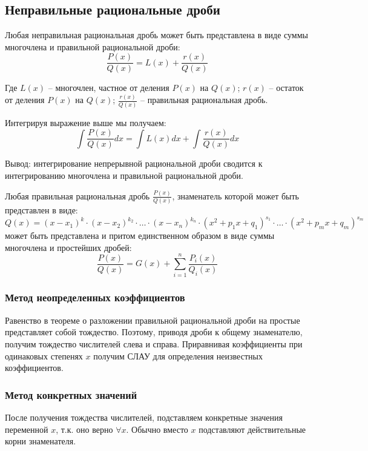 \subsection{Неправильные рациональные дроби}

Любая неправильная рациональная дробь может быть представлена в виде суммы многочлена и правильной рациональной дроби: \[
  \frac{P(x)}{Q(x)} = L(x) + \frac{r(x)}{Q(x)}
\]

Где $L(x)$ -- многочлен, частное от деления $P(x)$ на $Q(x)$; $r(x)$ -- остаток от деления $P(x)$ на $Q(x)$; $\frac{r(x)}{Q(x)}$ -- правильная рациональная дробь.

Интегрируя выражение выше мы получаем: \[
\int \frac{P(x)}{Q(x)} dx = \int L(x) dx + \int \frac{r(x)}{Q(x)}dx
\] 

Вывод: интегрирование непрерывной рациональной дроби сводится к интегрированию многочлена и правильной рациональной дроби.

\begin{theorem}
  Любая правильная рациональная дробь $\frac{P(x)}{Q(x)}$, знаменатель которой может быть представлен в виде: \[
  Q(x) = (x - x_1)^k \cdot (x - x_2)^{k_2} \cdot \ldots \cdot (x - x_{n})^{k_n} \cdot (x^2 + p_1 x + q_1)^{s_1} \cdot \ldots \cdot (x^2 + p_m x + q_m)^{s_m}
  \] 
  может быть представлена и притом единственном образом в виде суммы многочлена и простейших дробей: \[
    \frac{P(x)}{Q(x)}= G(x) + \sum_{i=1}^{n} \frac{P_i(x)}{Q_i(x)}
  \]
\end{theorem}

\subsubsection{Метод неопределенных коэффициентов}

Равенство в теореме о разложении правильной рациональной дроби на простые представляет собой тождество. Поэтому, приводя дроби к общему знаменателю, получим тождество числителей слева и справа. Приравнивая коэффициенты при одинаковых степенях $x$ получим СЛАУ для определения неизвестных коэффициентов.

\subsubsection{Метод конкретных значений}

После получения тождества числителей, подставляем конкретные значения переменной $x$, т.к. оно верно $\forall x$. Обычно вместо $x$ подставляют действительные корни знаменателя.

